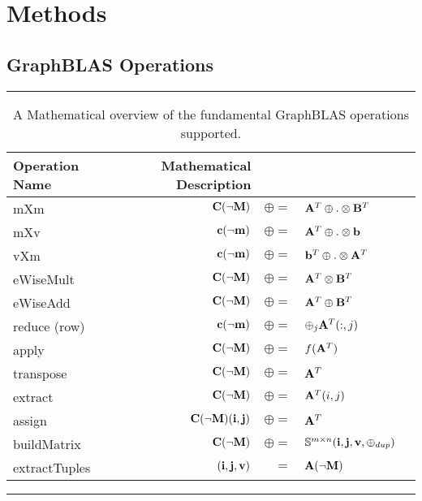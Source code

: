 \documentclass[11pt]{extarticle}
\begin{document}




\section{Methods}
\label{Sec:Methods}







\subsection{GraphBLAS Operations}

\begin{table*}[h]
\hrule
\begin{center}
\caption{A Mathematical overview of the fundamental GraphBLAS operations supported.}
\label{Tab:GraphBLASOps}
\begin{tabular}{l|rrl|l}
{\sf Operation Name} & Mathematical Description  \\
\hline
{\sf mXm}          & ${\bf C}(\neg{\bf M})$ & $\oplus=$ & ${\bf A}^T \oplus.\otimes {\bf B}^T$  \\
{\sf mXv}          & ${\bf c}(\neg{\bf m})$ & $\oplus=$ & ${\bf A}^T \oplus.\otimes {\bf b}$  \\
{\sf vXm}          & ${\bf c}(\neg{\bf m})$ & $\oplus=$ & ${\bf b}^T \oplus.\otimes {\bf A}^T$  \\
{\sf eWiseMult}    & ${\bf C}(\neg{\bf M})$ & $\oplus=$ & ${\bf A}^T \otimes {\bf B}^T$  \\
{\sf eWiseAdd}     & ${\bf C}(\neg{\bf M})$ & $\oplus=$ & ${\bf A}^T \oplus  {\bf B}^T$  \\
{\sf reduce} (row) & ${\bf c}(\neg{\bf m})$ & $\oplus=$ & $\oplus_j{\bf A}^T(:,j)$  \\
{\sf apply}        & ${\bf C}(\neg{\bf M})$ & $\oplus=$ & $f({\bf A}^T)$ \\
{\sf transpose}    & ${\bf C}(\neg{\bf M})$ & $\oplus=$ & ${\bf A}^T$ \\
{\sf extract}      & ${\bf C}(\neg{\bf M})$ & $\oplus=$ & ${\bf A}^T(i,j)$ \\
{\sf assign}       & ${\bf C}(\neg{\bf M})({\bf i},{\bf j})$ & $\oplus=$ & ${\bf A}^T$ \\
{\sf buildMatrix}  & ${\bf C}(\neg{\bf M})$ & $\oplus=$ & $\mathbb{S}^{m\times n}({\bf i},{\bf j},{\bf v},\oplus_{dup})$ \\
{\sf extractTuples}& $({\bf i},{\bf j},{\bf v})$ & $=$ & ${\bf A}(\neg{\bf M})$ \\
\end{tabular}
\end{center}
\hrule
\end{table*}
\end{document}
